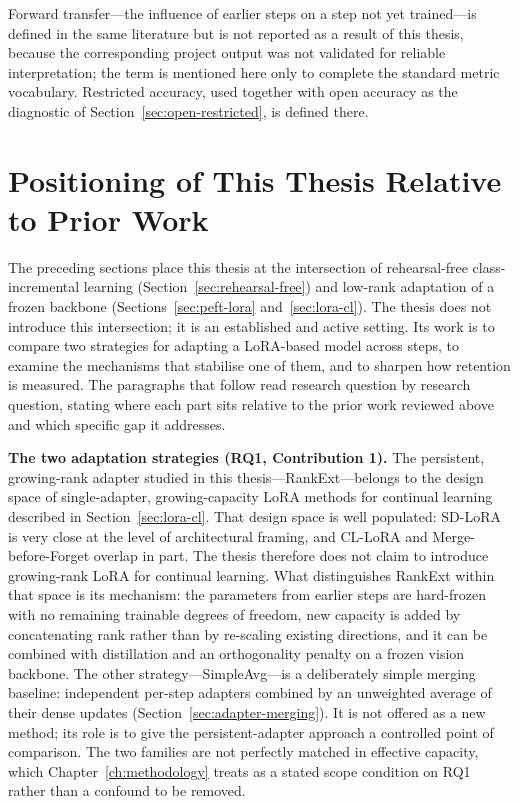Forward transfer---the influence of earlier steps on a step not yet
trained---is defined in the same literature but is not reported as a result
of this thesis, because the corresponding project output was not validated
for reliable interpretation; the term is mentioned here only to complete the
standard metric vocabulary. Restricted accuracy, used together with open
accuracy as the diagnostic of Section~\ref{sec:open-restricted}, is defined
there.

\section{Positioning of This Thesis Relative to Prior Work}
\label{sec:thesis-positioning}

The preceding sections place this thesis at the intersection of
rehearsal-free class-incremental learning (Section~\ref{sec:rehearsal-free}) and low-rank
adaptation of a frozen backbone (Sections~\ref{sec:peft-lora} and~\ref{sec:lora-cl}). The thesis does not
introduce this intersection; it is an established and active setting. Its
work is to compare two strategies for adapting a LoRA-based model across
steps, to examine the mechanisms that stabilise one of them, and to sharpen
how retention is measured. The paragraphs that follow read research
question by research question, stating where each part sits relative to the
prior work reviewed above and which specific gap it addresses.

\textbf{The two adaptation strategies (RQ1, Contribution 1).} The persistent, growing-rank
adapter studied in this thesis---RankExt---belongs to the design space of
single-adapter, growing-capacity LoRA methods for continual learning
described in Section~\ref{sec:lora-cl}. That design space is well populated: SD-LoRA \parencite{wu2025sdlora}
is very close at the level of architectural framing, and
CL-LoRA \parencite{he2025cllora} and Merge-before-Forget \parencite{qiao2025merge}
overlap in part. The thesis therefore does not claim to introduce
growing-rank LoRA for continual learning. What distinguishes RankExt within
that space is its mechanism: the parameters from earlier steps are
hard-frozen with no remaining trainable degrees of freedom, new capacity is
added by concatenating rank rather than by re-scaling existing directions,
and it can be combined with distillation and an orthogonality penalty on a
frozen vision backbone. The other strategy---SimpleAvg---is a deliberately
simple merging baseline: independent per-step adapters combined by an
unweighted average of their dense updates (Section~\ref{sec:adapter-merging}). It is not
offered as a new method; its role is to give the persistent-adapter
approach a controlled point of comparison. The two families are not
perfectly matched in effective capacity, which Chapter~\ref{ch:methodology} treats as a stated
scope condition on RQ1 rather than a confound to be removed.

